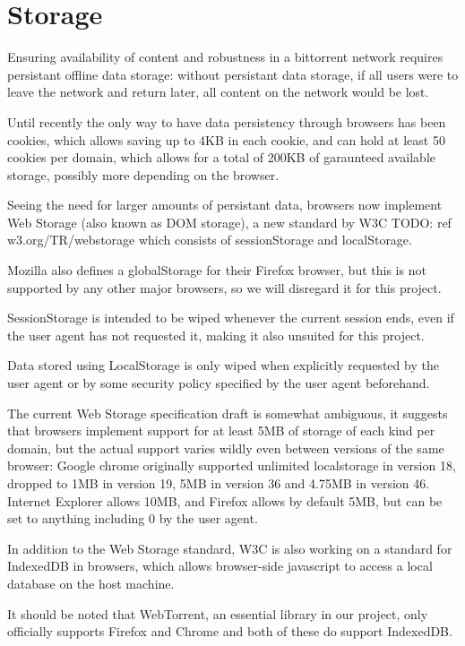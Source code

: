 

\section{Storage}
Ensuring availability of content and robustness in a bittorrent network requires persistant offline data storage:
without persistant data storage, if all users were to leave the network and return later, all content on the 
network would be lost.
\newline

Until recently the only way to have data persistency through browsers has been cookies, 
which allows saving up to 4KB in each cookie, and can hold at least 50 cookies per domain, 
which allows for a total of 200KB of garaunteed available storage, possibly more depending on the browser.
\newline

Seeing the need for larger amounts of persistant data, browsers now implement Web Storage 
(also known as DOM storage),
a new standard by W3C
TODO: ref w3.org/TR/webstorage 
which consists of sessionStorage and localStorage.

Mozilla also defines a globalStorage for their Firefox browser, 
but this is not supported by any other major browsers, so we will disregard it for this project.

SessionStorage is intended to be wiped whenever the current session ends, 
even if the user agent has not requested it, making it also unsuited for this project.

Data stored using LocalStorage is only wiped when explicitly requested by the user agent or 
by some security policy specified by the user agent beforehand.
\newline

The current Web Storage specification draft is somewhat ambiguous, 
it suggests that browsers implement support for at least 5MB of storage of each kind per domain,
but the actual support varies wildly even between versions of the same browser:
Google chrome originally supported unlimited localstorage in version 18, dropped to 1MB in version 19, 
5MB in version 36 and 4.75MB in version 46. 
Internet Explorer allows 10MB, 
and Firefox allows by default 5MB, but can be set to anything including 0 by the user agent.
\newline

In addition to the Web Storage standard, W3C is also working on a standard for IndexedDB in browsers, 
which allows browser-side javascript to access a local database on the host machine.

It should be noted that WebTorrent, 
an essential library in our project, 
only officially supports Firefox and Chrome 
and both of these do support IndexedDB.
\newline
